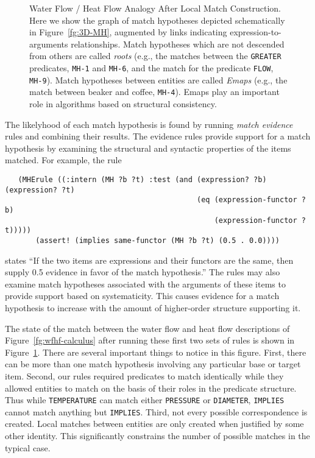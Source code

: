 \begin{figure}
\border
\vspace{4.4in}
\caption[Water Flow / Heat Flow Analogy]{Water Flow / Heat Flow
Analogy After Local Match Construction. Here we show the graph of match
hypotheses depicted schematically in Figure~\ref{fg:3D-MH}, augmented by links
indicating expression-to-arguments relationships. Match hypotheses which are not
descended from others are called {\it roots} (e.g., the matches
between the {\tt GREATER} predicates, {\tt MH-1} and {\tt MH-6}, and the
match for the predicate {\tt FLOW}, {\tt MH-9}). Match hypotheses between
entities are called {\it Emaps} (e.g., the match between beaker and coffee,
{\tt MH-4}).  Emaps play an important role in algorithms based on structural
consistency.}
\label{fg:wfhf-local}
\border
\end{figure}


The likelyhood of each match hypothesis is found by
running {\it match evidence} rules and combining their results. The evidence
rules provide support for a match hypothesis by examining the structural and
syntactic properties of the items matched. For example, the rule
\begin{verbatim}
   (MHErule ((:intern (MH ?b ?t) :test (and (expression? ?b) (expression? ?t)
                                            (eq (expression-functor ?b)
                                                (expression-functor ?t)))))
       (assert! (implies same-functor (MH ?b ?t) (0.5 . 0.0))))
\end{verbatim}
states ``If the two items are expressions and their functors are the same, then
supply 0.5 evidence in favor of the match hypothesis.'' The rules may also
examine match hypotheses associated with the arguments of these items to
provide support based on systematicity. This causes evidence for a match
hypothesis to increase with the amount of higher-order structure supporting
it.

The state of the match between the water flow and heat flow descriptions of
Figure~\ref{fg:wfhf-calculus} after running these first two sets of rules is
shown in Figure~\ref{fg:wfhf-local}.  There are several important things to
notice in this figure.  First, there can be more than one match
hypothesis involving any particular base or target
item.  Second, our rules required predicates to match identically while they
allowed entities to match on the basis of their roles in the predicate
structure.  Thus while {\tt TEMPERATURE} can match either {\tt PRESSURE} or
{\tt DIAMETER}, {\tt IMPLIES} cannot match anything but {\tt IMPLIES}.
Third, not every possible correspondence is created. Local matches between
entities are only created when justified by some other identity.  This
significantly constrains the number of possible matches in the typical case.


